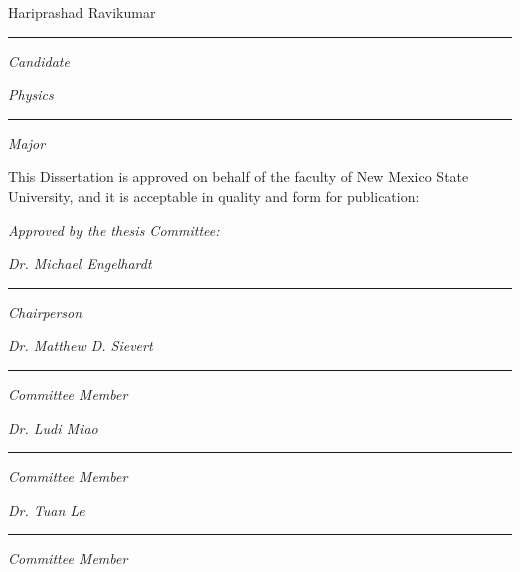 \noindent

\setlength{\baselineskip}{\singlespace}
\vspace{0.1in}
\begin{flushleft}

\small
Hariprashad Ravikumar

\vspace{4pt}
\hrule
\vspace{4pt}

\large
\textit{Candidate}

\vspace{0.3in}

\small
\textit{Physics}

\vspace{4pt}
\hrule
\vspace{4pt}

\large
\textit{Major}

\vspace{0.4in}

\small
This Dissertation is approved on behalf of the faculty of New Mexico State University, and it is acceptable in quality and form for publication:
\begin{center} 
\end{center}


\large
\textit{Approved by the thesis Committee:}

\vspace{0.2in}

\small
\textit{Dr. Michael Engelhardt}
\vspace{4pt}
\hrule
\vspace{4pt}
\large
\textit{Chairperson}

\vspace{0.2in}

\small
\textit{Dr. Matthew D. Sievert}
\vspace{4pt}
\hrule
\vspace{4pt}
\large
\textit{Committee Member}

\vspace{0.2in}

\small
\textit{Dr. Ludi Miao}
\vspace{4pt}
\hrule
\vspace{4pt}
\large
\textit{Committee Member}

\vspace{0.2in}

\small
\textit{Dr. Tuan Le}
\vspace{4pt}
\hrule
\vspace{4pt}
\large
\textit{Committee Member}


\end{flushleft}

\setlength{\baselineskip}{\doublespace}




